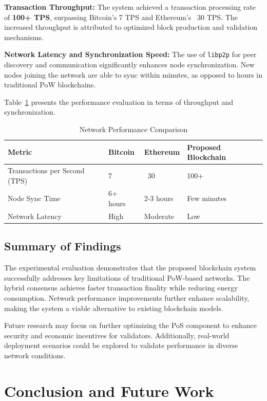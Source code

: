 \documentclass[conference]{IEEEtran}
\begin{document}
\textbf{Transaction Throughput:} The system achieved a transaction processing rate of \textbf{100+ TPS}, surpassing Bitcoin's 7 TPS and Ethereum's ~30 TPS. The increased throughput is attributed to optimized block production and validation mechanisms.

\textbf{Network Latency and Synchronization Speed:} The use of \texttt{libp2p} for peer discovery and communication significantly enhances node synchronization. New nodes joining the network are able to sync within minutes, as opposed to hours in traditional PoW blockchains.

Table~\ref{tab:network} presents the performance evaluation in terms of throughput and synchronization.

\begin{table}[h]
    \centering
    \caption{Network Performance Comparison}
    \label{tab:network}
    \begin{tabularx}{\linewidth}{|X|X|X|X|}
        \hline
        \textbf{Metric} & \textbf{Bitcoin} & \textbf{Ethereum} & \textbf{Proposed Blockchain} \\
        \hline
        Transactions per Second (TPS) & 7 & ~30 & 100+ \\
        \hline
        Node Sync Time & 6+ hours & 2-3 hours & Few minutes \\
        \hline
        Network Latency & High & Moderate & Low \\
        \hline
    \end{tabularx}
\end{table}

\subsection{Summary of Findings}
The experimental evaluation demonstrates that the proposed blockchain system successfully addresses key limitations of traditional PoW-based networks. The hybrid consensus achieves faster transaction finality while reducing energy consumption. Network performance improvements further enhance scalability, making the system a viable alternative to existing blockchain models.

Future research may focus on further optimizing the PoS component to enhance security and economic incentives for validators. Additionally, real-world deployment scenarios could be explored to validate performance in diverse network conditions.


\section{Conclusion and Future Work}
\end{document}
